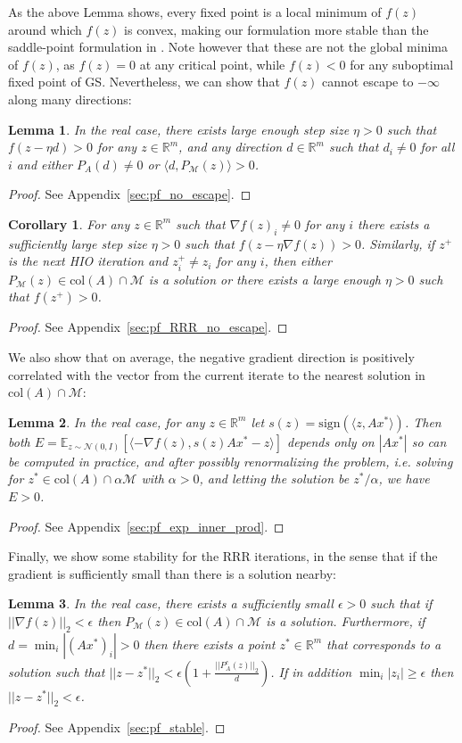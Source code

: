 \documentclass[12pt]{article}
\newtheorem{lemma}{Lemma}
\newtheorem{corollary}{Corollary}
\theoremstyle{definition}
\theoremstyle{remark}
\theoremstyle{definition}
\theoremstyle{problem}
\theoremstyle{definition}
\newcommand{\blem}{\begin{lemma}}
\newcommand{\elem}{\end{lemma}}
\newcommand{\bpof}{\begin{proof}}
\newcommand{\epof}{\end{proof}}
\newcommand{\bcor}{\begin{corollary}}
\newcommand{\ecor}{\end{corollary}}
\newcommand{\col}{\text{col}}
\newcommand{\sign}{\text{sign}}
\newcommand{\RR}{\mathbb{R} }
\newcommand{\MM}{\mathcal{M}}
\newcommand{\EE}{\mathbb{E}}
\begin{document}
As the above Lemma shows, every fixed point is a local minimum of $f(z)$ around which $f(z)$ is convex, making our formulation more stable than the saddle-point formulation in \cite{Marchesini2007}. Note however that these are not the global minima of $f(z)$, as $f(z)=0$ at any critical point, while $f(z)<0$ for any suboptimal fixed point of GS. Nevertheless, we can show that $f(z)$ cannot escape to $-\infty$ along many directions:

\blem\label{lem:no_escape} In the real case, there exists large enough step size $\eta>0$ such that $f(z-\eta d) > 0$ for any $z\in\RR^m$, and any direction $d\in\RR^m$ such that $d_i\neq 0$ for all $i$ and either $P_A(d)\neq 0$ or $\langle d, P_{\MM}(z)\rangle > 0$. \elem
\bpof See Appendix~\ref{sec:pf_no_escape}. \epof

\bcor\label{cor:RRR_no_escape} For any $z\in\RR^m$ such that $\nabla f(z)_i\neq 0$ for any $i$ there exists a sufficiently large step size $\eta>0$ such that $f(z-\eta\nabla f(z)) > 0$. Similarly, if $z^+$ is the next HIO iteration and $z^+_i\neq z_i$ for any $i$, then either $P_{\MM}(z)\in\col(A)\cap\MM$ is a solution or there exists a large enough $\eta>0$ such that $f(z^+)>0$. \ecor
\bpof See Appendix~\ref{sec:pf_RRR_no_escape}. \epof

We also show that on average, the negative gradient direction is positively correlated with the vector from the current iterate to the nearest solution in $\col(A)\cap\MM$:
\blem\label{lem:exp_inner_prod} In the real case, for any $z\in\RR^m$ let $s(z) = \sign\left(\langle z, Ax^*\rangle\right)$. Then both $E = \EE_{z\sim\mathcal{N}(0, I)}\left[\langle -\nabla f(z), s(z)Ax^*-z\rangle\right]$ depends only on $|Ax^*|$ so can be computed in practice, and after possibly renormalizing the problem, i.e. solving for $z^*\in\col(A)\cap\alpha\MM$ with $\alpha>0$, and letting the solution be $z^*/\alpha$, we have $E>0$. \elem
\bpof See Appendix~\ref{sec:pf_exp_inner_prod}. \epof

Finally, we show some stability for the RRR iterations, in the sense that if the gradient is sufficiently small than there is a solution nearby:
\blem\label{lem:stable} In the real case, there exists a sufficiently small $\epsilon>0$ such that if $||\nabla f(z)||_2< \epsilon$ then $P_{\MM}(z)\in\col(A)\cap\MM$ is a solution. Furthermore, if $d=\min_i|(Ax^*)_i|>0$ then there exists a point $z^*\in\RR^m$ that corresponds to a solution such that $||z-z^*||_2<\epsilon\left(1 + \frac{||P_A^c(z)||_2}{d}\right)$. If in addition $\min_i|z_i|\geq\epsilon$ then $||z-z^*||_2< \epsilon$.\elem
\bpof See Appendix~\ref{sec:pf_stable}. \epof
\end{document}
